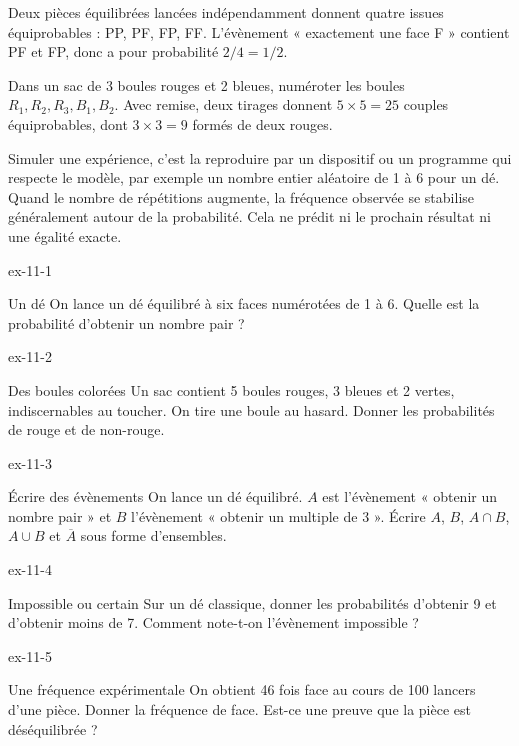 \begin{exemple}Deux pièces équilibrées lancées indépendamment donnent quatre issues équiprobables : PP, PF, FP, FF. L’évènement « exactement une face F » contient PF et FP, donc a pour probabilité $2/4=1/2$.\end{exemple}
\begin{savoirfaire}Dans un sac de 3 boules rouges et 2 bleues, numéroter les boules $R_1,R_2,R_3,B_1,B_2$. Avec remise, deux tirages donnent $5\times5=25$ couples équiprobables, dont $3\times3=9$ formés de deux rouges.\end{savoirfaire}
\begin{propriete}Simuler une expérience, c’est la reproduire par un dispositif ou un programme qui respecte le modèle, par exemple un nombre entier aléatoire de 1 à 6 pour un dé. Quand le nombre de répétitions augmente, la fréquence observée se stabilise généralement autour de la probabilité. Cela ne prédit ni le prochain résultat ni une égalité exacte.\end{propriete}
\clearpage{}
\begin{blocLivre}{ex-11-1}\begin{exercice}[1]{Un dé}
On lance un dé équilibré à six faces numérotées de 1 à 6. Quelle est la probabilité d’obtenir un nombre pair ?
\end{exercice}\end{blocLivre}
\begin{blocLivre}{ex-11-2}\begin{exercice}[1]{Des boules colorées}
Un sac contient 5 boules rouges, 3 bleues et 2 vertes, indiscernables au toucher. On tire une boule au hasard. Donner les probabilités de rouge et de non-rouge.
\end{exercice}\end{blocLivre}
\begin{blocLivre}{ex-11-3}\begin{exercice}[1]{Écrire des évènements}
On lance un dé équilibré. $A$ est l’évènement « obtenir un nombre pair » et $B$ l’évènement « obtenir un multiple de 3 ». Écrire $A$, $B$, $A\cap B$, $A\cup B$ et $\overline A$ sous forme d’ensembles.
\end{exercice}\end{blocLivre}
\begin{blocLivre}{ex-11-4}\begin{exercice}[1]{Impossible ou certain}
Sur un dé classique, donner les probabilités d’obtenir 9 et d’obtenir moins de 7. Comment note-t-on l’évènement impossible ?
\end{exercice}\end{blocLivre}
\begin{blocLivre}{ex-11-5}\begin{exercice}[1]{Une fréquence expérimentale}
On obtient 46 fois face au cours de 100 lancers d’une pièce. Donner la fréquence de face. Est-ce une preuve que la pièce est déséquilibrée ?
\end{exercice}\end{blocLivre}

